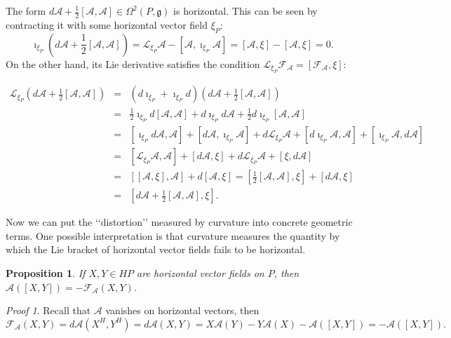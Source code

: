 \documentclass[11pt]{report}
\theoremstyle{plain}
\newtheorem{prop}[thm]{Proposition}
\theoremstyle{definition}
\theoremstyle{remark}
\theoremstyle{remark}
\newtheorem*{pr}{Proof}
\numberwithin{equation}{section}
\begin{document}
The form $d\mathcal{A} +\frac{1}{2}[\mathcal{A}, \mathcal{A}]\in \Omega^2(P,\mathfrak{g})$ is horizontal. This can be seen by contracting it with some horizontal vector field $\xi_P$:
$$\imath_{\xi_P}(d\mathcal{A} +\frac{1}{2}[\mathcal{A}, \mathcal{A}]) = \mathcal{L}_{\xi_P}\mathcal{A} - [\mathcal{A}, \imath_{\xi_P}\mathcal{A}]= [\mathcal{A}, \xi]-[\mathcal{A}, \xi]=0.$$
On the other hand, its Lie derivative satisfies the condition $\mathcal{L}_{\xi_P}\mathcal{F}_{\mathcal{A}} = [\mathcal{F}_{\mathcal{A}},\xi]$:


\begin{spacing}{1.45}
$\begin{array}{lcl}
\mathcal{L}_{\xi_P}(d\mathcal{A} +\frac{1}{2}[\mathcal{A}, \mathcal{A}]) &=& (d\imath_{\xi_P} + \imath_{\xi_P}d)(d\mathcal{A} +\frac{1}{2}[\mathcal{A}, \mathcal{A}]) \\
&=& \frac{1}{2}\imath_{\xi_P}d[\mathcal{A}, \mathcal{A}] + d\imath_{\xi_P}d\mathcal{A} + \frac{1}{2}d\imath_{\xi_P}[\mathcal{A}, \mathcal{A}]\\
&=& [\imath_{\xi_P}d\mathcal{A}, \mathcal{A}] +[d\mathcal{A}, \imath_{\xi_P}\mathcal{A}] + d\mathcal{L}_{\xi_P}\mathcal{A} +[d\imath_{\xi_P}\mathcal{A}, \mathcal{A}] + [\imath_{\xi_P}\mathcal{A}, d\mathcal{A}]\\
&=& [\mathcal{L}_{\xi_P}\mathcal{A}, \mathcal{A}] + [d\mathcal{A}, \xi] + d\mathcal{L}_{\xi_P}\mathcal{A} + [\xi, d\mathcal{A}]\\
&=& [[\mathcal{A},\xi], \mathcal{A}] + d [\mathcal{A}, \xi] = [\frac{1}{2}[\mathcal{A}, \mathcal{A}], \xi] + [d\mathcal{A}, \xi] \\
&=& [d\mathcal{A} + \frac{1}{2}[\mathcal{A}, \mathcal{A}], \xi].
 
 \end{array}$
 \end{spacing}


Now we can put the \lq\lq{}distortion\rq\rq{} measured by curvature into concrete geometric terms. 
One possible interpretation is that curvature measures the quantity by which the Lie bracket of horizontal vector fields fails to be horizontal. 
\begin{prop}
If $X,Y\in HP$ are horizontal vector fields on $P$, then 
$\mathcal{A} ([X,Y]) = - \mathcal{F}_{\mathcal{A}}(X,Y)$.
\end{prop}

\begin{pr}
Recall that $\mathcal{A}$ vanishes on horizontal vectors, then
$$ 
\mathcal{F}_{\mathcal{A}}(X,Y) = d \mathcal{A} (X^H,Y^H) = d \mathcal{A} (X,Y) = X\mathcal{A}(Y) - Y\mathcal{A}(X) - \mathcal{A} ([X,Y]) = - \mathcal{A} ([X,Y]).$$
\end{pr}
\end{document}
